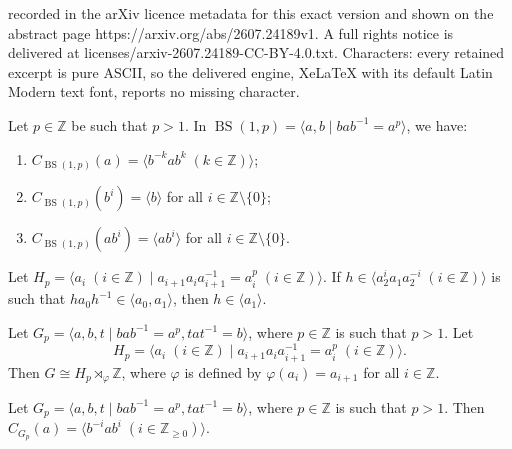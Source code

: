 \documentclass[10pt,a4paper]{amsart}
\newcommand{\Z}{\mathbb{Z}}
\begin{document}
recorded in the arXiv licence metadata for this exact version and shown on the abstract page https://arxiv.org/abs/2607.24189v1. A full rights notice is delivered at licenses/arxiv-2607.24189-CC-BY-4.0.txt. Characters: every retained excerpt is pure ASCII, so the delivered engine, XeLaTeX with its default Latin Modern text font, reports no missing character.
\begin{lem}
	\label{BS-cents}
	Let \(p \in \Z\) be such that \(p > 1\). In \(\operatorname{BS}(1, p) =
	\langle a, b \mid bab^{-1} = a^p \rangle\), we have:
	\begin{enumerate}
		\item \(C_{\operatorname{BS}(1, p)}(a) = \langle b^{-k} a b^k \; (k \in \Z) \rangle\);
			\label{item:BS-cent-a}
		\item \(C_{\operatorname{BS}(1, p)}(b^i) = \langle b \rangle\) for all
				\(i \in \Z \setminus \{0\}\);
			\label{item:BS-cent-b}
		\item \(C_{\operatorname{BS}(1, p)}(ab^i) = \langle ab^i \rangle\) for all
				\(i \in \Z \setminus \{0\}\).
			\label{item:BS-cent-abi}
	\end{enumerate}
\end{lem}

\begin{lem}
		\label{conj-into-ab}
		Let \(H_p = \langle a_i \; (i \in \Z) \mid a_{i + 1} a_i a_{i + 1}^{-1} 
		= a_i^p \; (i \in \Z)\rangle\). If \(h \in \langle a_2^i a_1 a_2^{-i} \;
		(i \in \Z) \rangle\) is such that \(h a_0 h^{-1} \in \langle a_0, a_1
		\rangle\), then \(h \in \langle a_1 \rangle\).
\end{lem}

\begin{lem}
	\label{inf-pres}
	Let \(G_p = \langle a, b, t \mid bab^{-1} = a^p, tat^{-1} = b\rangle\), where
	\(p \in \Z\) is such that \(p > 1\). Let
	\[
	 H_p = 
			\langle a_i \; (i \in \Z) \mid a_{i + 1} a_i
	a_{i + 1}^{-1} = a_i^p \; (i \in \Z)\rangle.
	\]
	Then \(G \cong H_p \rtimes_\varphi \Z\), where \(\varphi\) is defined by
	\(\varphi(a_i) = a_{i + 1}\) for all \(i \in \Z\).
\end{lem}

\begin{lem}
		\label{cents}
		Let \(G_p = \langle a, b, t \mid bab^{-1} = a^p, tat^{-1} = b\rangle\),
		where \(p \in \Z\) is such that \(p > 1\).  Then \(C_{G_p}(a) = \langle
		b^{-i} a b^i \; (i  \in \Z_{\geq 0}) \rangle\).
\end{lem}
\end{document}
